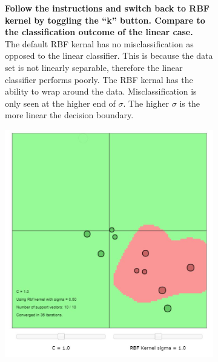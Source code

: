 \documentclass[11pt,oneside,a4paper]{article}
\begin{document}
 \begin{figure}
 	\centering
 	\begin{subfigure}[b]{.5\textwidth}
 	
 		\textbf{Follow the instructions and switch back to RBF kernel by toggling the “k” button. Compare to the classification outcome of the linear case.}\\
 		
		 The default RBF kernal has no misclassification as opposed to the linear classifier. This is because the data set is not linearly separable, therefore the linear classifier performs poorly. The RBF kernal has the ability to wrap around the data. Misclassification is only seen at the higher end of  $\sigma$. The higher  $\sigma$  is the more linear the decision boundary. 
 		
 	
 	\end{subfigure}%
 	\begin{subfigure}{.5\textwidth}
 		\vspace{-185pt}
 		\centering
 		\includegraphics[width=0.9\linewidth]{../Figures/Default_RBF}
 	\end{subfigure}
 \end{figure}
 
\end{document}
